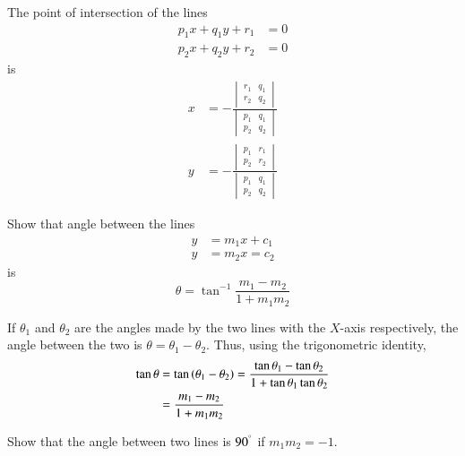 \begin{problem}
The point of intersection of the lines
\begin{align}
p_1x+q_1y+r_1 &= 0
\\
p_2x+q_2y+r_2 &= 0
\end{align}
is
\begin{align}
x &= -\frac{
\begin{vmatrix}
r_1 & q_1
\\
r_2 & q_2
\end{vmatrix}
}{
\begin{vmatrix}
p_1 & q_1
\\
p_2 & q_2
\end{vmatrix}
}
\\
y &= -\frac{
\begin{vmatrix}
p_1 & r_1
\\
p_2 & r_2
\end{vmatrix}
}{
\begin{vmatrix}
p_1 & q_1
\\
p_2 & q_2
\end{vmatrix}
}
\end{align}
\end{problem}
\begin{problem}
Show that angle between the lines
%
\begin{align}
y &= m_1 x + c_1
\\
y &= m_2 x = c_2
\end{align}
%
is
%
\begin{equation}
\label{eq:ch1_line_ang}
\theta = \tan ^{-1} \frac{m_1 - m_2}{1 + m_1m_2}
\end{equation}
%
\end{problem}
\proof If $\theta_1$ and $\theta_2$ are the angles made by the two lines with the $X$-axis respectively, the angle between the two is $\theta = \theta_1 - \theta_2$.  Thus, using the trigonometric identity,
\begin{align}
\tan \theta &= \tan \left(\theta_1 - \theta_2\right) = \frac{\tan \theta_1 - \tan \theta_2}{1 + \tan \theta_1 \tan \theta_2}
\\
&=
\frac{m_1 - m_2}{1 + m_1m_2}
\end{align}
\begin{problem}
\label{prob:ch2_perp}
Show that the angle between two lines is $90^{\degree}$ if $m_1m_2 = -1$.
\end{problem}
%
